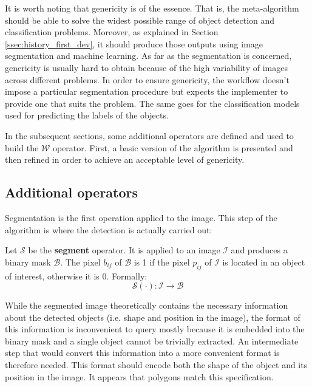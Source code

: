 It is worth noting that genericity is of the essence. That is, the meta-algorithm should be able to solve the widest possible range of object detection and classification problems. Moreover, as explained in Section \ref{ssec:history_first_dev}, it should produce those outputs using image segmentation and machine learning. As far as the segmentation is concerned, genericity is usually hard to obtain because of the high variability of images across different problems. In order to ensure genericity, the workflow doesn't impose a particular segmentation procedure but expects the implementer to provide one that suits the problem. The same goes for the classification models used for predicting the labels of the objects. 

In the subsequent sections, some additional operators are defined and used to build the $\mathcal{W}$ operator. First, a basic version of the algorithm is presented and then refined in order to achieve an acceptable level of genericity.

\subsection{Additional operators}
\label{ssec:other_operators}

Segmentation is the first operation applied to the image. This step of the algorithm is where the detection is actually carried out:
 
\begin{definition} \label{def:segmentation_op}
Let $\mathcal{S}$ be the \textbf{segment} operator. It is applied to an image $\mathcal{I}$ and produces a binary mask $\mathcal{B}$. The pixel $b_{ij}$ of $\mathcal{B}$ is 1 if the pixel $p_{ij}$ of $\mathcal{I}$ is located in an object of interest, otherwise it is 0. Formally:
\begin{equation}
	\label{eqn:operator_segment}
	\mathcal{S}(\cdot) : \mathcal{I} \rightarrow \mathcal{B}
\end{equation}
\end{definition}

While the segmented image theoretically contains the necessary information about the detected objects (i.e. shape and position in the image), the format of this information is inconvenient to query mostly because it is embedded into the binary mask and a single object cannot be trivially extracted. An intermediate step that would convert this information into a more convenient format is therefore needed. This format should encode both the shape of the object and its position in the image. It appears that polygons match this specification. 

